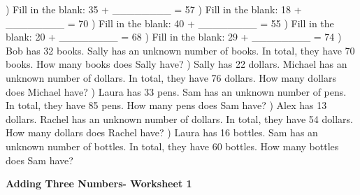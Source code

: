 \documentclass{article}%
\begin{document}
\newline%
) Fill in the blank: 35 + \_\_\_\_\_\_\_\_ = 57%
\newline%
\newline%
) Fill in the blank: 18 + \_\_\_\_\_\_\_\_ = 70%
\newline%
\newline%
) Fill in the blank: 40 + \_\_\_\_\_\_\_\_ = 55%
\newline%
\newline%
) Fill in the blank: 20 + \_\_\_\_\_\_\_\_ = 68%
\newline%
\newline%
) Fill in the blank: 29 + \_\_\_\_\_\_\_\_ = 74%
\newline%
\newline%
) Bob has 32 books. Sally has an unknown number of books. In total, they have 70 books. How many books does Sally have?%
\newline%
\newline%
) Sally has 22 dollars. Michael has an unknown number of dollars. In total, they have 76 dollars. How many dollars does Michael have?%
\newline%
\newline%
) Laura has 33 pens. Sam has an unknown number of pens. In total, they have 85 pens. How many pens does Sam have?%
\newline%
\newline%
) Alex has 13 dollars. Rachel has an unknown number of dollars. In total, they have 54 dollars. How many dollars does Rachel have?%
\newline%
\newline%
) Laura has 16 bottles. Sam has an unknown number of bottles. In total, they have 60 bottles. How many bottles does Sam have?%
\newline%
\newline%
\newline%
\pagebreak%
\large%
\begin{center}%
\textbf{Adding Three Numbers- Worksheet 1}%
\newline%
\newline%
\newline%
\end{center} \normalsize%
\end{document}
